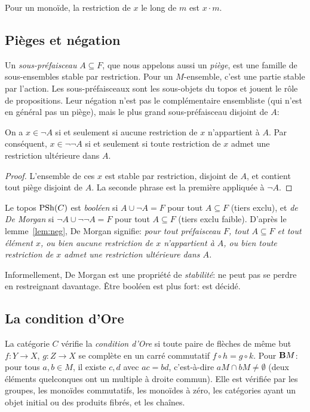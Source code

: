 Pour un monoïde, la restriction de $x$ le long de $m$ est $x\cdot m$.

\subsection{Pièges et négation}

Un \emph{sous-préfaisceau} $A\subseteq F$, que nous appelons aussi un \emph{piège}, est une famille de sous-ensembles stable par restriction. Pour un $M$-ensemble, c'est une partie stable par l'action. Les sous-préfaisceaux sont les sous-objets du topos et jouent le rôle de propositions. Leur négation n'est pas le complémentaire ensembliste (qui n'est en général pas un piège), mais le plus grand sous-préfaisceau disjoint de $A$:

\begin{lemma}\label{lem:neg}
On a $x\in\neg A$ si et seulement si aucune restriction de $x$ n'appartient à $A$. Par conséquent, $x\in\neg\neg A$ si et seulement si toute restriction de $x$ admet une restriction ultérieure dans $A$.
\end{lemma}

\begin{proof}
L'ensemble de ces $x$ est stable par restriction, disjoint de $A$, et contient tout piège disjoint de $A$. La seconde phrase est la première appliquée à $\neg A$.
\end{proof}

\begin{definition}
Le topos $\mathrm{PSh}(C)$ est \emph{booléen} si $A\cup\neg A = F$ pour tout $A\subseteq F$ (tiers exclu), et \emph{de De Morgan} si $\neg A\cup\neg\neg A = F$ pour tout $A\subseteq F$ (tiers exclu faible). D'après le lemme~\ref{lem:neg}, De Morgan signifie: \emph{pour tout préfaisceau $F$, tout $A\subseteq F$ et tout élément $x$, ou bien aucune restriction de $x$ n'appartient à $A$, ou bien toute restriction de $x$ admet une restriction ultérieure dans $A$.}
\end{definition}

Informellement, De Morgan est une propriété de \emph{stabilité}:  ne peut pas se perdre en restreignant davantage. Être booléen est plus fort:  est décidé.

\subsection{La condition d'Ore}

La catégorie $C$ vérifie la \emph{condition d'Ore} si toute paire de flèches de même but $f : Y\to X$, $g : Z\to X$ se complète en un carré commutatif $f\circ h = g\circ k$. Pour $\mathbf{B} M$: pour tous $a,b\in M$, il existe $c,d$ avec $ac = bd$, c'est-à-dire $aM\cap bM\neq\emptyset$ (deux éléments quelconques ont un multiple à droite commun). Elle est vérifiée par les groupes, les monoïdes commutatifs, les monoïdes à zéro, les catégories ayant un objet initial ou des produits fibrés, et les chaînes.

